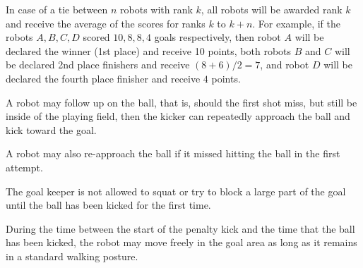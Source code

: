 \documentclass[12pt]{hurocup}
\begin{document}
\begin{lawlist}[PK]
\item In case of a tie between $n$ robots with rank $k$, all robots
 will be awarded rank $k$ and receive the average of the scores for
 ranks $k$ to $k+n$.  For example, if the robots $A,B,C,D$ scored $10,
 8, 8, 4$ goals respectively, then robot $A$ will be declared the
 winner (1st place) and receive 10 points, both robots $B$ and $C$
 will be declared 2nd place finishers and receive $(8+6)/2=7$, and
 robot $D$ will be declared the fourth place finisher and receive $4$
 points.

\end{lawlist}

\begin{decisions}
\item A robot may follow up on the ball, that is, should the first
  shot miss, but still be inside of the playing field, then the kicker
  can repeatedly approach the ball and kick toward the goal.
\item A robot may also re-approach the ball if it missed hitting the
  ball in the first attempt.
\item The goal keeper is not allowed to squat or try to block a large
  part of the goal until the ball has been kicked for the first
  time. 
\item During the time between the start of the penalty kick and the
  time that the ball has been kicked, the robot may move freely in the
  goal area as long as it remains in a standard walking posture.
\end{decisions}
\end{document}
